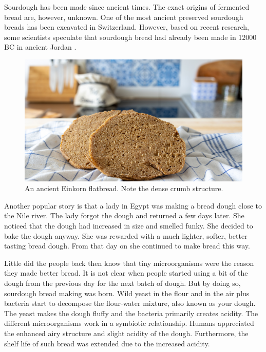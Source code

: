 Sourdough has been made since ancient times. The exact origins of fermented
bread are, however, unknown. One of the most ancient preserved
sourdough breads has been excavated in Switzerland.
However, based on recent research, some scientists speculate that sourdough
bread had already been made in 12000 BC in ancient Jordan \cite{jordan+bread}.

\begin{figure}[h]
  \includegraphics[width=\textwidth]{einkorn-crumb}
  \caption{An ancient Einkorn flatbread. Note the dense crumb structure.}
  \label{einkorn-crumb}
\end{figure}

Another popular story is that a lady in Egypt was making
a bread dough close to the Nile river. The lady forgot the
dough and returned a few days later. She noticed that the dough had
increased in size and smelled funky. She decided to bake
the dough anyway. She was rewarded with a much
lighter, softer, better tasting bread dough. From that day
on she continued to make bread this way.

Little did the people back then know that tiny microorganisms
were the reason they made better bread. It is not clear when
people started using a bit of the dough from the previous
day for the next batch of dough. But by doing so, sourdough
bread making was born. Wild yeast in the flour and in the air
plus bacteria start to decompose the flour-water mixture, also
known as your dough. The yeast makes the dough fluffy and
the bacteria primarily creates acidity. The different
microorganisms work in a symbiotic relationship. Humans
appreciated the enhanced airy structure and slight acidity
of the dough. Furthermore, the shelf life of such bread
was extended due to the increased acidity. 

